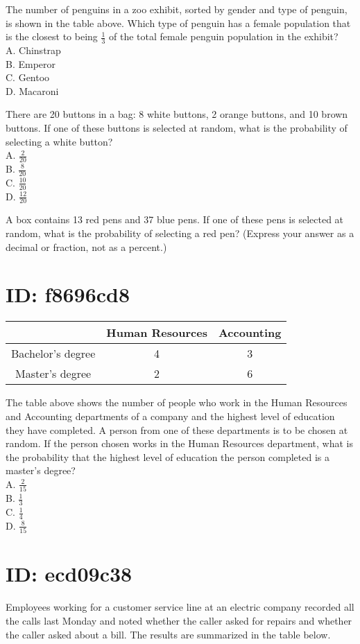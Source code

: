 The number of penguins in a zoo exhibit, sorted by gender and type of penguin, is shown in the table above. Which type of penguin has a female population that is the closest to being $\frac{1}{3}$ of the total female penguin population in the exhibit?\\
A. Chinstrap\\
B. Emperor\\
C. Gentoo\\
D. Macaroni

There are 20 buttons in a bag: 8 white buttons, 2 orange buttons, and 10 brown buttons. If one of these buttons is selected at random, what is the probability of selecting a white button?\\
A. $\frac{2}{20}$\\
B. $\frac{8}{20}$\\
C. $\frac{10}{20}$\\
D. $\frac{12}{20}$

A box contains 13 red pens and 37 blue pens. If one of these pens is selected at random, what is the probability of selecting a red pen? (Express your answer as a decimal or fraction, not as a percent.)

\section*{ID: f8696cd8}
\begin{center}
\begin{tabular}{|c|c|c|}
\hline
 & Human Resources & Accounting \\
\hline
Bachelor's degree & 4 & 3 \\
\hline
Master's degree & 2 & 6 \\
\hline
\end{tabular}
\end{center}

The table above shows the number of people who work in the Human Resources and Accounting departments of a company and the highest level of education they have completed. A person from one of these departments is to be chosen at random. If the person chosen works in the Human Resources department, what is the probability that the highest level of education the person completed is a master's degree?\\
A. $\frac{2}{15}$\\
B. $\frac{1}{3}$\\
C. $\frac{1}{4}$\\
D. $\frac{8}{15}$

\section*{ID: ecd09c38}
Employees working for a customer service line at an electric company recorded all the calls last Monday and noted whether the caller asked for repairs and whether the caller asked about a bill. The results are summarized in the table below.

